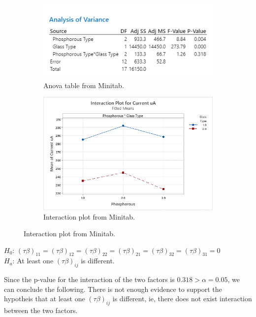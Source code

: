 \documentclass{article}
\begin{document}
\begin{figure}[h]
    \centering
    \begin{subfigure}[b]{0.4\textwidth}
        \includegraphics[width=1\textwidth]{./images/3_b.png}
        \caption{Anova table from Minitab.}
      \label{fig:img1}
    \end{subfigure}
    \hfill
    \begin{subfigure}[b]{0.5\textwidth}
        \includegraphics[width=1\textwidth]{./images/3_b_2.png}
        \caption{Interaction plot from Minitab.}
      \label{fig:img2}
    \end{subfigure}
    \label{fig:both}
\end{figure}

\begin{flushleft}
    $H_0$: $(\tau \beta)_{11} = (\tau \beta)_{12} = (\tau \beta)_{22} = (\tau \beta)_{21} = (\tau \beta)_{32} = (\tau \beta)_{31} = 0$ \\
    $H_a$: At least one $(\tau \beta)_{ij}$ is different.\\
\end{flushleft}

Since the p-value for the interaction of the two factors is $0.318 > \alpha = 0.05$, we can conclude the following.
There is not enough evidence to support the hypotheis that at least one $(\tau \beta)_{ij}$ is different,
ie, there does not exist interaction between the two factors. 
\end{document}
